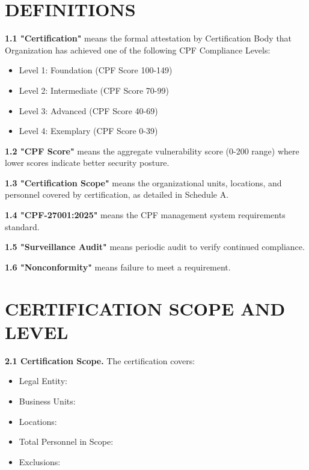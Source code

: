 \documentclass[11pt,a4paper]{article}
\begin{document}
\section{DEFINITIONS}

\textbf{1.1 "Certification"} means the formal attestation by Certification Body that Organization has achieved one of the following CPF Compliance Levels:
\begin{itemize}
\item Level 1: Foundation (CPF Score 100-149)
\item Level 2: Intermediate (CPF Score 70-99)
\item Level 3: Advanced (CPF Score 40-69)
\item Level 4: Exemplary (CPF Score 0-39)
\end{itemize}

\textbf{1.2 "CPF Score"} means the aggregate vulnerability score (0-200 range) where lower scores indicate better security posture.

\textbf{1.3 "Certification Scope"} means the organizational units, locations, and personnel covered by certification, as detailed in Schedule A.

\textbf{1.4 "CPF-27001:2025"} means the CPF management system requirements standard.

\textbf{1.5 "Surveillance Audit"} means periodic audit to verify continued compliance.

\textbf{1.6 "Nonconformity"} means failure to meet a requirement.

\section{CERTIFICATION SCOPE AND LEVEL}

\textbf{2.1 Certification Scope.} The certification covers:

\begin{itemize}
\item[] Legal Entity: \underline{\hspace{10cm}}
\item[] Business Units: \underline{\hspace{10cm}}
\item[] Locations: \underline{\hspace{10cm}}
\item[] Total Personnel in Scope: \underline{\hspace{4cm}}
\item[] Exclusions: \underline{\hspace{10cm}}
\end{itemize}
\end{document}
